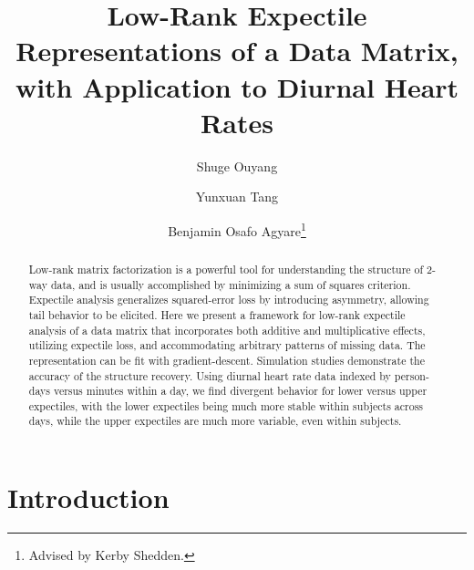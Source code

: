 \documentclass{article}
\title{Low-Rank Expectile Representations of a Data Matrix, with Application to Diurnal Heart Rates}
\author[1]{Shuge Ouyang\textdagger}
\author[2]{Yunxuan Tang\textdagger}
\author[1]{Benjamin Osafo Agyare\thanks{Advised by Kerby Shedden.}}
\affil[1]{Department of Statistics, University of Michigan}
\affil[2]{Department of Computer Science Engineering, University of Michigan}
\date{}
\begin{document}
\maketitle
\renewcommand{\thefootnote}{\fnsymbol{footnote}}

\renewcommand{\thefootnote}{\arabic{footnote}}

\begin{abstract}
    Low-rank matrix factorization is a powerful tool for understanding the structure of 2-way data, and is usually accomplished by minimizing a sum of squares criterion. Expectile analysis generalizes squared-error loss by introducing asymmetry, allowing tail behavior to be elicited. Here we present a framework for low-rank expectile analysis of a data matrix that incorporates both additive and multiplicative effects, utilizing expectile loss, and accommodating arbitrary patterns of missing data. The representation can be fit with gradient-descent. Simulation studies demonstrate the accuracy of the structure recovery. Using diurnal heart rate data indexed by person-days versus minutes within a day, we find divergent behavior for lower versus upper expectiles, with the lower expectiles being much more stable within subjects across days, while the upper expectiles are much more variable, even within subjects.
\end{abstract}

\section{Introduction}



\end{document}
